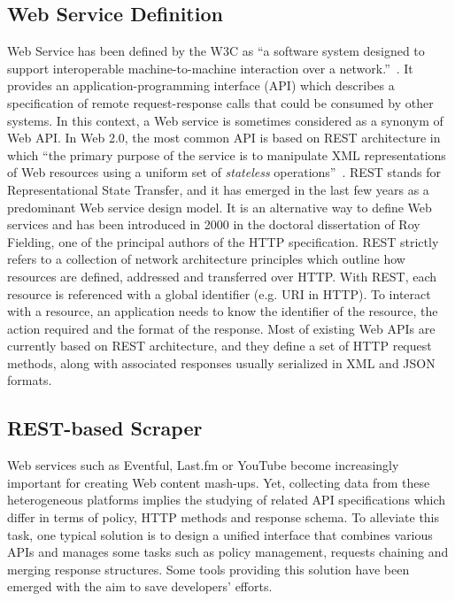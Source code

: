 \subsection{Web Service Definition}	
Web Service has been defined by the W3C as ``a software system designed to support interoperable machine-to-machine interaction over a network.''~\cite{WS:2004}. It provides an application-programming interface (API) which describes a specification of remote request-response calls that could be consumed by other systems. In this context, a Web service is sometimes considered as a synonym of Web API. In Web 2.0, the most common API is based on REST architecture in which ``the primary purpose of the service is to manipulate XML representations of Web resources using a uniform set of \emph{stateless} operations''~\cite{WS:2004}. REST stands for Representational State Transfer, and it has emerged in the last few years as a predominant Web service design model. It is an alternative way to define Web services and has been introduced in 2000 in the doctoral dissertation of Roy Fielding, one of the principal authors of the HTTP specification. REST strictly refers to a collection of network architecture principles which outline how resources are defined, addressed and transferred over HTTP. With REST, each resource is referenced with a global identifier (e.g. URI in HTTP). To interact with a resource, an application needs to know the identifier of the resource, the action required and the format of the response. Most of existing Web APIs are currently based on REST architecture, and they define a set of HTTP request methods, along with associated responses usually serialized in XML and JSON formats.

\subsection{REST-based Scraper}	

Web services such as Eventful, Last.fm or YouTube become increasingly important for creating Web content mash-ups. Yet, collecting data from these heterogeneous platforms implies the studying of related API specifications which differ in terms of policy, HTTP methods and response schema. To alleviate this task, one typical solution is to design a unified interface that combines various APIs and manages some tasks such as policy management, requests chaining and merging response structures. Some tools providing this solution have been emerged with the aim to save developers' efforts. 

